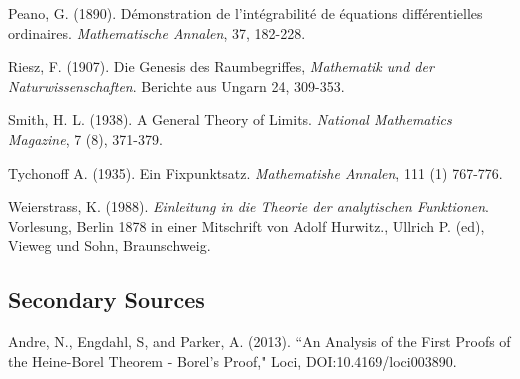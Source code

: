\documentclass[12pt]{article}
\begin{document}
\begin{thebibliography}{99}
 Peano, G. (1890). D\'{e}monstration de l'int\'{e}grabilit\'{e} de \'{e}quations diff\'{e}rentielles ordinaires. {\em Mathematische Annalen}, 37, 182-228.

 Riesz, F. (1907). Die Genesis des Raumbegriffes, {\em Mathematik und der Naturwissenschaften}. Berichte aus Ungarn 24, 309-353.

 Smith, H. L. (1938). A General Theory of Limits. {\em National Mathematics Magazine}, 7 (8), 371-379.

 Tychonoff A. (1935). Ein Fixpunktsatz. {\em Mathematishe Annalen}, 111 (1) 767-776.


 Weierstrass, K. (1988). {\em Einleitung in die Theorie der analytischen Funktionen}. Vorlesung, Berlin 1878 in einer Mitschrift von Adolf Hurwitz., Ullrich P. (ed), Vieweg und Sohn, Braunschweig.



\subsection*{Secondary Sources}



 Andre, N., Engdahl, S, and Parker, A. (2013). ``An Analysis of the First Proofs of the Heine-Borel Theorem - Borel's Proof," Loci, DOI:10.4169/loci003890.






\end{thebibliography}
\end{document}
